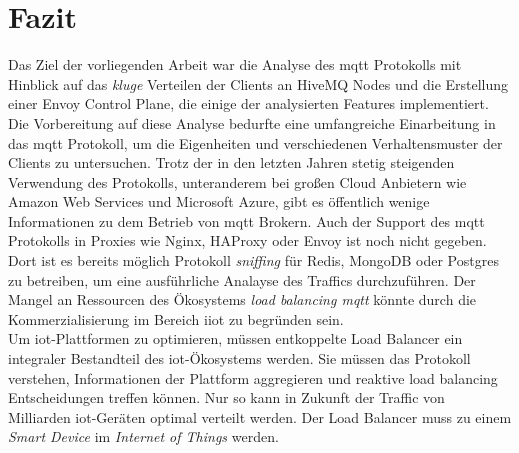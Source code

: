 \section{Fazit}
Das Ziel der vorliegenden Arbeit war die Analyse des \ac{mqtt} Protokolls mit Hinblick auf das \textit{kluge} Verteilen der Clients an HiveMQ Nodes und die Erstellung einer Envoy Control Plane, die einige der analysierten Features implementiert.
\\
Die Vorbereitung auf diese Analyse bedurfte eine umfangreiche Einarbeitung in das \ac{mqtt} Protokoll, um die Eigenheiten und verschiedenen Verhaltensmuster der Clients zu untersuchen.
Trotz der in den letzten Jahren stetig steigenden Verwendung des Protokolls, unteranderem bei gro{\ss}en Cloud Anbietern wie Amazon Web Services und Microsoft Azure, gibt es öffentlich wenige Informationen zu dem Betrieb von \ac{mqtt} Brokern.
Auch der Support des \ac{mqtt} Protokolls in Proxies wie Nginx, HAProxy oder Envoy ist noch nicht gegeben. Dort ist es bereits möglich Protokoll \textit{sniffing} für Redis, MongoDB oder Postgres zu betreiben, um eine ausführliche Analayse des Traffics durchzuführen.
Der Mangel an Ressourcen des Ökosystems \textit{load balancing \ac{mqtt}} könnte durch die Kommerzialisierung im Bereich \ac{iiot} zu begründen sein.
\\
Um \ac{iot}-Plattformen zu optimieren, müssen entkoppelte Load Balancer ein integraler Bestandteil des \ac{iot}-Ökosystems werden. Sie müssen das Protokoll verstehen, Informationen der Plattform aggregieren und reaktive load balancing Entscheidungen treffen können. Nur so kann in Zukunft der Traffic von Milliarden \ac{iot}-Geräten optimal verteilt werden.
Der Load Balancer muss zu einem \textit{Smart Device} im \textit{Internet of Things} werden.

